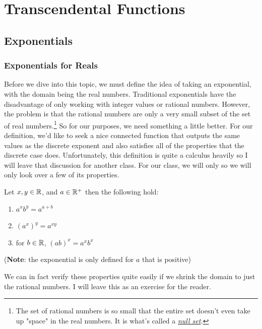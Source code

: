 \edef\mychapter{Transcendental Functions}
\edef\mychapterdate{June 25, 2024}

\chapter{\mychapter}
\section{Exponentials}
\subsection{Exponentials for Reals}
Before we dive into this topic, we must define the idea of taking an exponential, with the domain being the real numbers. Traditional exponentials have the disadvantage of only working with integer values or rational numbers.
However, the problem is that the rational numbers are only a very small subset of the set of real numbers.\footnote{
The set of rational numbers is so small that the entire set doesn't even take up "space" in the real numbers. It is what's called a \textit{\href{https://en.wikipedia.org/wiki/Null_set}{null set}.}}
So for our purposes, we need something a little better.
For our definition, we'd like to seek a nice connected function that outputs the same values as the discrete exponent and also satisfies all of the properties that the discrete case does.
Unfortunately, this definition is quite a calculus heavily so I will leave that discussion for another class. For our class, we will only so we will only look over a few of its properties.
\begin{theorem}
Let $x,y\in\mathbb{R}$, and $a\in\mathbb{R}^{+}$ then the following hold:
\begin{enumerate}
	\item $a^xb^y=a^{a+b}$
	\item $(a^x)^y=a^{xy}$
	\item for $b\in\mathbb{R}$, $(ab)^x=a^xb^x$
\end{enumerate}
(\textbf{Note}: the exponential is only defined for $a$ that is positive)
\end{theorem}

We can in fact verify these properties quite easily if we shrink the domain to just the rational numbers. I will leave this as an exercise for the reader.

\begin{figure}[h]
	\centering
	\caption{}
	\label{fig:exp}
\end{figure}

